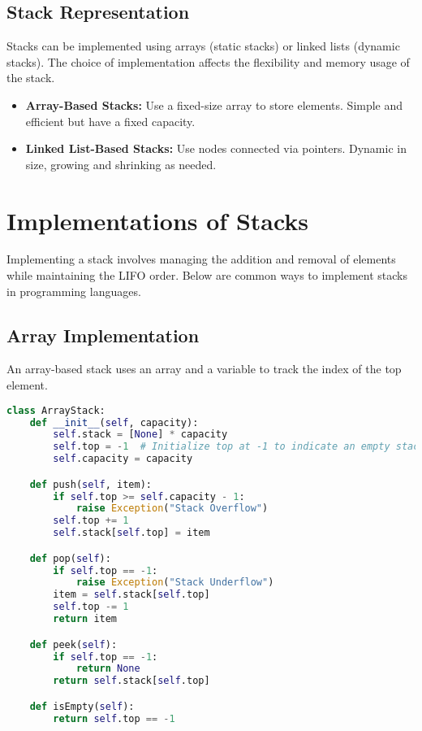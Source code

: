 \subsection{Stack Representation}

Stacks can be implemented using arrays (static stacks) or linked lists (dynamic stacks). The choice of implementation affects the flexibility and memory usage of the stack.

\begin{itemize}
    \item \textbf{Array-Based Stacks:} Use a fixed-size array to store elements. Simple and efficient but have a fixed capacity.
    \item \textbf{Linked List-Based Stacks:} Use nodes connected via pointers. Dynamic in size, growing and shrinking as needed.
\end{itemize}

\section{Implementations of Stacks}

Implementing a stack involves managing the addition and removal of elements while maintaining the LIFO order. Below are common ways to implement stacks in programming languages.

\subsection{Array Implementation}

An array-based stack uses an array and a variable to track the index of the top element.

\begin{fullwidth}
\begin{lstlisting}[language=Python]
class ArrayStack:
    def __init__(self, capacity):
        self.stack = [None] * capacity
        self.top = -1  # Initialize top at -1 to indicate an empty stack
        self.capacity = capacity

    def push(self, item):
        if self.top >= self.capacity - 1:
            raise Exception("Stack Overflow")
        self.top += 1
        self.stack[self.top] = item

    def pop(self):
        if self.top == -1:
            raise Exception("Stack Underflow")
        item = self.stack[self.top]
        self.top -= 1
        return item

    def peek(self):
        if self.top == -1:
            return None
        return self.stack[self.top]

    def isEmpty(self):
        return self.top == -1
\end{lstlisting}
\end{fullwidth}

